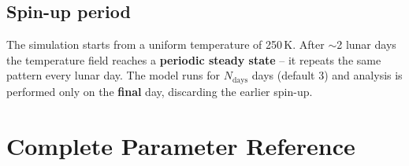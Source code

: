 \documentclass[12pt, a4paper]{article}
\begin{document}
\subsection{Spin-up period}

The simulation starts from a uniform temperature of 250\,K.
After $\sim$2 lunar days the temperature field reaches a
\textbf{periodic steady state} -- it repeats the same pattern
every lunar day.
The model runs for $N_{\mathrm{days}}$ days (default 3) and
analysis is performed only on the \textbf{final} day,
discarding the earlier spin-up.

\section{Complete Parameter Reference}
\end{document}
